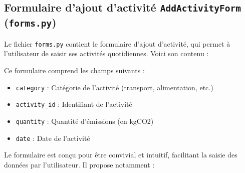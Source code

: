 \documentclass[a4paper,11pt]{article}
\begin{document}
            \subsection{Formulaire d'ajout d'activité \texttt{AddActivityForm} (\texttt{forms.py})}
                \noindent Le fichier \texttt{forms.py} contient le formulaire d'ajout d'activité, qui permet à l'utilisateur de saisir ses activités quotidiennes. Voici son contenu :

                

                \noindent Ce formulaire comprend les champs suivants :

                \begin{itemize}
                    \item \texttt{category} : Catégorie de l'activité (transport, alimentation, etc.)
                    \item \texttt{activity\_id} : Identifiant de l'activité
                    \item \texttt{quantity} : Quantité d'émissions (en kgCO2)
                    \item \texttt{date} : Date de l'activité
                \end{itemize}

                \noindent Le formulaire est conçu pour être convivial et intuitif, facilitant la saisie des données par l'utilisateur. Il propose notamment :
\end{document}
